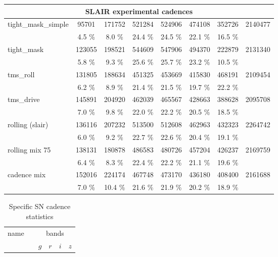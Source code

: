 \begin{appendices}
\begin{longtable}{l|ccccccc}
\hline
\hline
\multicolumn{8}{c}{SLAIR experimental cadences}\\
\hline
   tight\_mask\_simple &   95701 &  171752 &  521284 &  524906 &  474108 &  352726 &  2140477 \\ 
                     &    4.5 \% &    8.0 \% &   24.4 \% &   24.5 \% &   22.1 \% &   16.5 \% & \\
\hline
          tight\_mask &  123055 &  198521 &  544609 &  547906 &  494370 &  222879 &  2131340 \\ 
                     &    5.8 \% &    9.3 \% &   25.6 \% &   25.7 \% &   23.2 \% &   10.5 \% & \\
\hline
            tms\_roll &  131805 &  188634 &  451325 &  453669 &  415830 &  468191 &  2109454 \\ 
                     &    6.2 \% &    8.9 \% &   21.4 \% &   21.5 \% &   19.7 \% &   22.2 \% & \\
\hline
           tms\_drive &  145891 &  204920 &  462039 &  465567 &  428663 &  388628 &  2095708 \\ 
                     &    7.0 \% &    9.8 \% &   22.0 \% &   22.2 \% &   20.5 \% &   18.5 \% & \\
\hline
     rolling (slair) &  136116 &  207232 &  513500 &  512608 &  462963 &  432323 &  2264742 \\ 
                     &    6.0 \% &    9.2 \% &   22.7 \% &   22.6 \% &   20.4 \% &   19.1 \% & \\
\hline
      rolling mix 75 &  138131 &  180878 &  486583 &  480726 &  457204 &  426237 &  2169759 \\ 
                     &    6.4 \% &    8.3 \% &   22.4 \% &   22.2 \% &   21.1 \% &   19.6 \% & \\
\hline
         cadence mix &  152016 &  224174 &  467748 &  473170 &  436180 &  408400 &  2161688 \\ 
                     &    7.0 \% &   10.4 \% &   21.6 \% &   21.9 \% &   20.2 \% &   18.9 \% & \\
         \hline
\end{longtable}
\begin{longtable}{l|l|cccc}
  \caption{Specific SN cadence statistics\label{tab:sn_specific_cadence_stats}}        \\
  \hline
  \hline    
  name & & \multicolumn{4}{c}{ bands } \\
       & & $g$ & $r$ & $i$ & $z$  \\


\end{longtable}
\end{appendices}
